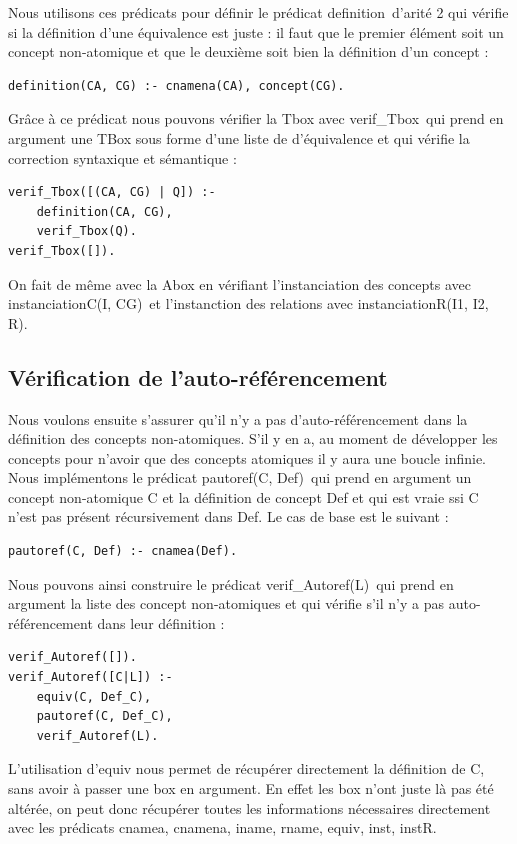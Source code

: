 \documentclass{article}
\begin{document}
Nous utilisons ces prédicats pour définir le prédicat \color{blue}definition\color{black}\ d'arité 2 qui vérifie si la définition d'une équivalence est juste : il faut que le premier élément soit un concept non-atomique et que le deuxième soit bien la définition d'un concept :
\begin{verbatim}
definition(CA, CG) :- cnamena(CA), concept(CG).
\end{verbatim}

Grâce à ce prédicat nous pouvons vérifier la Tbox avec \color{blue}verif\_Tbox\color{black}\ qui prend en argument une TBox sous forme d'une liste de d'équivalence et qui vérifie la correction syntaxique et sémantique : 
\begin{verbatim}
verif_Tbox([(CA, CG) | Q]) :- 
    definition(CA, CG), 
    verif_Tbox(Q).
verif_Tbox([]).
\end{verbatim}
On fait de même avec la Abox en vérifiant l'instanciation des concepts avec \color{blue}instanciationC(I, CG)\color{black}\ et l'instanction des relations avec \color{blue}instanciationR(I1, I2, R)\color{black}.
\subsection{Vérification de l'auto-référencement}
Nous voulons ensuite s'assurer qu'il n'y a pas d'auto-référencement dans la définition des concepts non-atomiques. S'il y en a, au moment de développer les concepts pour n'avoir que des concepts atomiques il y aura une boucle infinie. Nous implémentons le prédicat \color{blue}pautoref(C, Def)\color{black}\ qui prend en argument un concept non-atomique C et la définition de concept Def et qui est vraie ssi C n'est pas présent récursivement dans Def. Le cas de base est le suivant :
\begin{verbatim}
pautoref(C, Def) :- cnamea(Def).
\end{verbatim}

Nous pouvons ainsi construire le prédicat \color{blue}verif\_Autoref(L)\color{black}\ qui prend en argument la liste des concept non-atomiques et qui vérifie s'il n'y a pas auto-référencement dans leur définition : 
\begin{verbatim}
verif_Autoref([]).
verif_Autoref([C|L]) :-
	equiv(C, Def_C),
	pautoref(C, Def_C),
	verif_Autoref(L).
\end{verbatim}
L'utilisation d'equiv nous permet de récupérer directement la définition de C, sans avoir à passer une box en argument. En effet les box n'ont juste là pas été altérée, on peut donc récupérer toutes les informations nécessaires directement avec les prédicats  \color{blue}cnamea, cnamena, iname, rname, equiv, inst, instR\color{black}.
\end{document}
